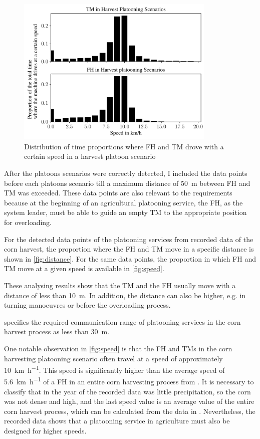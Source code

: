 \begin{figure}%
	\centering
	\includegraphics[width=0.85\textwidth]{figures/speedHarvestScenario.pdf}
	\caption{Distribution of time proportions where \acf{FH} and \acf{TM} drove with a certain speed in a harvest platoon scenario}%
	\label{fig:speed}%
\end{figure}

After the platoons scenarios were correctly detected, I included the data points before each platoons scenario till a maximum distance of \SI{50}{\metre} between \ac{FH} and \ac{TM} was exceeded. These data points are also relevant to the requirements because at the beginning of an agricultural platooning service, the \ac{FH}, as the system leader, must be able to guide an empty \ac{TM} to the appropriate position for overloading.

For the detected data points of the platooning services from recorded data of the corn harvest, the proportion where the \ac{FH} and \ac{TM} move in a specific distance is shown in \autoref{fig:distance}. For the same data points, the proportion in which \ac{FH} and \ac{TM} move at a given speed is available in \autoref{fig:speed}.

These analysing results show that the \ac{TM} and the \ac{FH} usually move with a distance of less than \SI{10}{\metre}. In addition, the distance can also be higher, e.g. in turning manoeuvres or before the overloading process.

\textcite{smolnik_5g_2020} specifies the required communication range of platooning services in the corn harvest process as less than \SI{30}{\metre}.

One notable observation in \autoref{fig:speed} is that the \ac{FH} and \ac{TM}s in the corn harvesting platooning scenario often travel at a speed of approximately \SI{10}{\kilo\metre\per\hour}. This speed is significantly higher than the average speed of \SI{5.6}{\kilo\metre\per\hour} of a \ac{FH} in an entire corn harvesting process from \cite{faustzahlen2018}. It is necessary to classify that in the year of the recorded data was little precipitation, so the corn was not dense and high, and the last speed value is an average value of the entire corn harvest process, which can be calculated from the data in \cite{faustzahlen2018}.
Nevertheless, the recorded data shows that a platooning service in agriculture must also be designed for higher speeds. 

